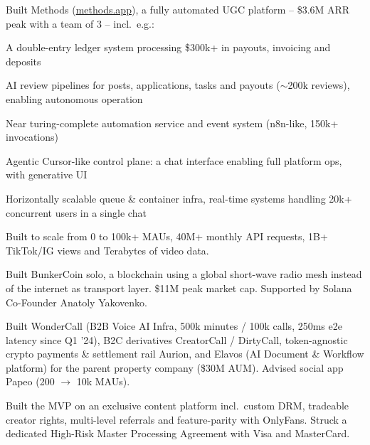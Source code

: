 \documentclass{cv-template}
\begin{document}
\vspace{0.1em}

Built Methods (\href{https://methods.app}{methods.app}), a fully automated UGC platform -- \$3.6M ARR peak with a team of 3 -- incl.\ e.g.:
\begin{tightlist}
  \item A double-entry ledger system processing \$300k+ in payouts, invoicing and deposits
  \item AI review pipelines for posts, applications, tasks and payouts ($\sim$200k reviews), enabling autonomous operation
  \item Near turing-complete automation service and event system (n8n-like, 150k+ invocations)
  \item Agentic Cursor-like control plane: a chat interface enabling full platform ops, with generative UI
  \item Horizontally scalable queue \& container infra, real-time systems handling 20k+ concurrent users in a single chat
\end{tightlist}
Built to scale from 0 to 100k+ MAUs, 40M+ monthly API requests, 1B+ TikTok/IG views and Terabytes of video data.

\vspace{0.2em}

\vspace{0.1em}

\begin{tightlist}
  \item Built BunkerCoin solo, a blockchain using a global short-wave radio mesh instead of the internet as transport layer. \$11M peak market cap. Supported by Solana Co-Founder Anatoly Yakovenko.
  \item Built WonderCall (B2B Voice AI Infra, 500k minutes / 100k calls, 250ms e2e latency since Q1 '24), B2C derivatives CreatorCall / DirtyCall, token-agnostic crypto payments \& settlement rail Aurion, and Elavos (AI Document \& Workflow platform) for the parent property company (\$30M AUM). Advised social app Papeo (200 $\to$ 10k MAUs).
  \item Built the MVP on an exclusive content platform incl.\ custom DRM, tradeable creator rights, multi-level referrals and feature-parity with OnlyFans. Struck a dedicated High-Risk Master Processing Agreement with Visa and MasterCard.
\end{tightlist}
\end{document}
